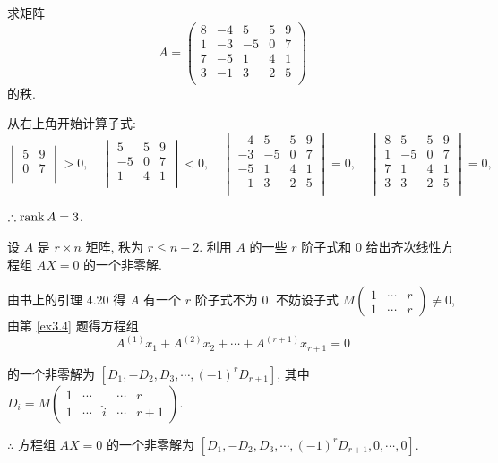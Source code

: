 \documentclass{ctexart}
\begin{document}
\begin{exercisec}[3.2.2(2)]
    求矩阵
    \[A=\begin{pmatrix}
        8 & -4 & 5 & 5 & 9 \\
        1 & -3 & -5 & 0 & 7 \\
        7 & -5 & 1 & 4 & 1 \\
        3 & -1 & 3 & 2 & 5 \\
    \end{pmatrix}\]
    的秩.
\end{exercisec}
\begin{solution}
    从右上角开始计算子式:
    \[\begin{vmatrix}
        5 & 9 \\
        0 & 7 \\
    \end{vmatrix}>0,\quad\begin{vmatrix}
        5 & 5 & 9 \\
        -5 & 0 & 7 \\
        1 & 4 & 1 \\
    \end{vmatrix}<0,\quad\begin{vmatrix}
        -4 & 5 & 5 & 9 \\
        -3 & -5 & 0 & 7 \\
        -5 & 1 & 4 & 1 \\
        -1 & 3 & 2 & 5 \\
    \end{vmatrix}=0,\quad\begin{vmatrix}
        8 & 5 & 5 & 9 \\
        1 & -5 & 0 & 7 \\
        7 & 1 & 4 & 1 \\
        3 & 3 & 2 & 5 \\
    \end{vmatrix}=0,\]

    $\therefore\operatorname{rank} A=3$.
\end{solution}
\begin{exercisec}[4.3.5]
    设 $A$ 是 $r\times n$ 矩阵, 秩为 $r\leq n-2$. 利用 $A$ 的一些 $r$ 阶子式和 $0$ 给出齐次线性方程组 $AX=0$ 的一个非零解.
\end{exercisec}
\begin{solution}
    由书上的引理 4.20 得 $A$ 有一个 $r$ 阶子式不为 $0$. 不妨设子式 $M\begin{pmatrix} 1 & \cdots & r \\ 1 & \cdots & r \end{pmatrix}\neq0$, 由第 \ref{ex3.4} 题得方程组
    \[A^{(1)}x_1+A^{(2)}x_2+\cdots+A^{(r+1)}x_{r+1}=0\]

    的一个非零解为 $[D_1,-D_2,D_3,\cdots,(-1)^rD_{r+1}]$, 其中 $D_i=M\begin{pmatrix} 1 & \cdots && \cdots & r \\ 1 & \cdots & \hat{i} & \cdots & r+1 \end{pmatrix}$.
    
    $\therefore$ 方程组 $AX=0$ 的一个非零解为 $[D_1,-D_2,D_3,\cdots,(-1)^rD_{r+1},0,\cdots,0]$.
\end{solution}
\end{document}
